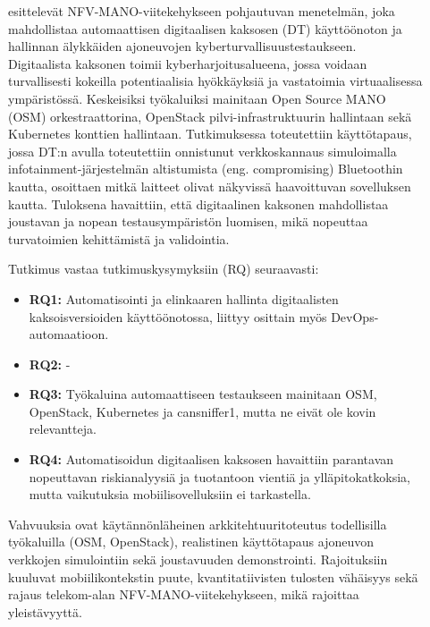 \documentclass[bscthesis,finnish,oneside,biblatex]{uefcsthesis}
\begin{document}
\begin{description}
    \item[\cite{grasselli2023_digitaltwin}] esittelevät NFV-MANO-viitekehykseen pohjautuvan menetelmän, joka mahdollistaa automaattisen digitaalisen kaksosen (DT) käyttöönoton ja hallinnan älykkäiden ajoneuvojen kyberturvallisuustestaukseen. Digitaalista kaksonen toimii kyberharjoitusalueena, jossa voidaan turvallisesti kokeilla potentiaalisia hyökkäyksiä ja vastatoimia virtuaalisessa ympäristössä. Keskeisiksi työkaluiksi mainitaan Open Source MANO (OSM) orkestraattorina, OpenStack pilvi-infrastruktuurin hallintaan sekä Kubernetes konttien hallintaan. Tutkimuksessa toteutettiin käyttötapaus, jossa DT:n avulla toteutettiin onnistunut verkkoskannaus simuloimalla infotainment-järjestelmän altistumista (eng. compromising) Bluetoothin kautta, osoittaen mitkä laitteet olivat näkyvissä haavoittuvan sovelluksen kautta. Tuloksena havaittiin, että digitaalinen kaksonen mahdollistaa joustavan ja nopean testausympäristön luomisen, mikä nopeuttaa turvatoimien kehittämistä ja validointia.

    Tutkimus vastaa tutkimuskysymyksiin (RQ) seuraavasti:
    \begin{itemize}
        \item \textbf{RQ1:} Automatisointi ja elinkaaren hallinta digitaalisten kaksoisversioiden käyttöönotossa, liittyy osittain myös DevOps-automaatioon. %
        \item \textbf{RQ2:} -
        \item \textbf{RQ3:} Työkaluina automaattiseen testaukseen mainitaan OSM, OpenStack, Kubernetes ja cansniffer1, mutta ne eivät ole kovin relevantteja.
        \item \textbf{RQ4:} Automatisoidun digitaalisen kaksosen havaittiin parantavan nopeuttavan riskianalyysiä ja tuotantoon vientiä ja ylläpitokatkoksia, mutta vaikutuksia mobiilisovelluksiin ei tarkastella.
    \end{itemize}

    Vahvuuksia ovat käytännönläheinen arkkitehtuuritoteutus todellisilla työkaluilla (OSM, OpenStack), realistinen käyttötapaus ajoneuvon verkkojen simulointiin sekä joustavuuden demonstrointi. Rajoituksiin kuuluvat mobiilikontekstin puute, kvantitatiivisten tulosten vähäisyys sekä rajaus telekom-alan NFV-MANO-viitekehykseen, mikä rajoittaa yleistävyyttä.
\end{description}
\end{document}
